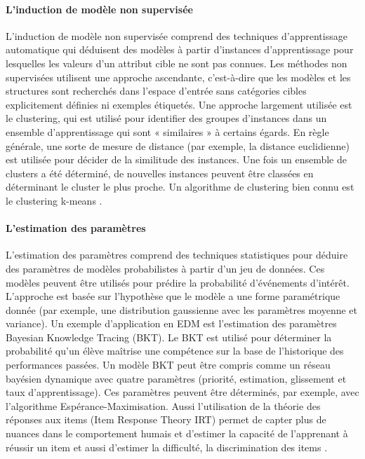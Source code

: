     \paragraph{L'induction de modèle non supervisée}

    L'induction de modèle non supervisée comprend des techniques d'apprentissage automatique qui déduisent des modèles à partir d'instances d'apprentissage pour lesquelles les valeurs d'un attribut cible ne sont pas connues. 
    Les méthodes non supervisées utilisent une approche ascendante, c'est-à-dire que les modèles et les structures 
    sont recherchés dans l'espace d'entrée sans catégories cibles explicitement définies ni exemples étiquetés. 
    Une approche largement utilisée est le clustering, qui est utilisé pour identifier des groupes d'instances dans 
    un ensemble d'apprentissage qui sont « similaires » à certains égards. En règle générale, une sorte de mesure de 
    distance (par exemple, la distance euclidienne) est utilisée pour décider de la similitude des instances. Une fois un 
    ensemble de clusters a été déterminé, de nouvelles instances peuvent être classées en déterminant le cluster le plus 
    proche. Un algorithme de clustering bien connu est le clustering k-means \cite{Scheuer2012}.
    
    \paragraph{L'estimation des paramètres}
    L'estimation des paramètres comprend des techniques statistiques pour déduire des paramètres de modèles probabilistes à partir d’un jeu de données. Ces modèles peuvent être utilisés pour prédire la probabilité d'événements d'intérêt. L'approche est basée sur l'hypothèse que le modèle a une forme paramétrique donnée (par exemple, une distribution gaussienne avec les paramètres moyenne et variance). Un exemple d'application en EDM est l'estimation des paramètres Bayesian Knowledge Tracing (BKT). Le BKT est utilisé pour déterminer la probabilité qu'un élève maîtrise une compétence sur la base de l'historique des performances passées. Un modèle BKT peut être compris comme un réseau bayésien dynamique avec quatre paramètres (priorité, estimation, glissement et taux d'apprentissage). Ces paramètres peuvent être déterminés, par exemple, avec l'algorithme Espérance-Maximisation. Aussi l’utilisation de la théorie des réponses aux items (Item Response Theory IRT) permet de capter plus de nuances dans le comportement humais et d’estimer la capacité de l’apprenant à réussir un item et aussi d’estimer la difficulté, la discrimination des items \cite{Scheuer2012}.

